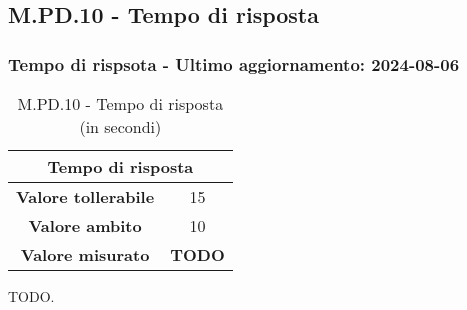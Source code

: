 \subsection{M.PD.10 - Tempo di risposta}

\subsubsection*{Tempo di rispsota - Ultimo aggiornamento: 2024-08-06}

\begin{table}[H]
  \centering
  \begin{tabular}{|c|c|}
      \hline
      \multicolumn{2}{|c|}{Tempo di risposta} \\
      \hline
      \textbf{Valore tollerabile} & 15 \\
      \hline
      \textbf{Valore ambito} & 10 \\
      \hline
      \textbf{Valore misurato} & \textbf{TODO} \\
      \hline
  \end{tabular}
  \caption{M.PD.10 - Tempo di risposta (in secondi)}
\end{table}

\par TODO.